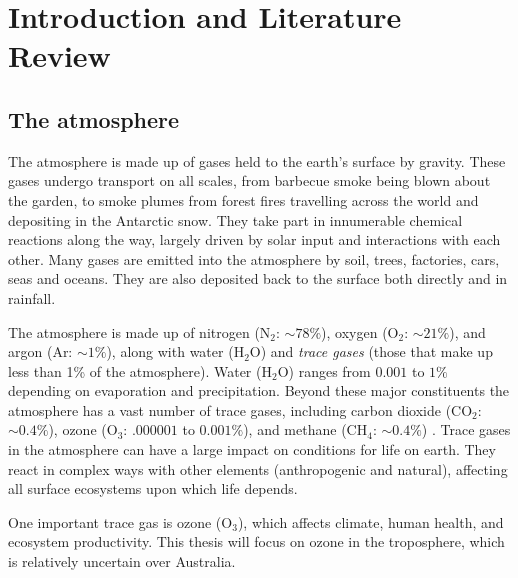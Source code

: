\chapter{Introduction and Literature Review} %
\label{LR}

\section{The atmosphere}
\label{LR:Atmos}
  The atmosphere is made up of gases held to the earth's surface by gravity. 
  These gases undergo transport on all scales, from barbecue smoke being blown about the garden, to smoke plumes from forest fires travelling across the world and depositing in the Antarctic snow.
  They take part in innumerable chemical reactions along the way, largely driven by solar input and interactions with each other.
  Many gases are emitted into the atmosphere by soil, trees, factories, cars, seas and oceans.
  They are also deposited back to the surface both directly and in rainfall.
  
  The atmosphere is made up of nitrogen (N$_2$: $\sim 78\%$), oxygen (O$_2$: $\sim 21\%$), and argon (Ar: $\sim 1\%$), along with water (H$_2$O) and \textit{trace gases} (those that make up less than 1\% of the atmosphere).
  Water (H$_2$O) ranges from $0.001$ to $1\%$ depending on evaporation and precipitation.
  Beyond these major constituents the atmosphere has a vast number of trace gases, including carbon dioxide (CO$_2$: $\sim 0.4\%$), ozone (O$_3$: $.000001$ to $0.001\%$), and methane (CH$_4$: $\sim 0.4\%$) \parencite[][Ch. 2]{BrasseurJacob2017}.
  Trace gases in the atmosphere can have a large impact on conditions for life on earth.
  They react in complex ways with other elements (anthropogenic and natural), affecting all surface ecosystems upon which life depends.
  
  One important trace gas is ozone (O$_3$), which affects climate, human health, and ecosystem productivity.
  This thesis will focus on ozone in the troposphere, which is relatively uncertain over Australia.
  
